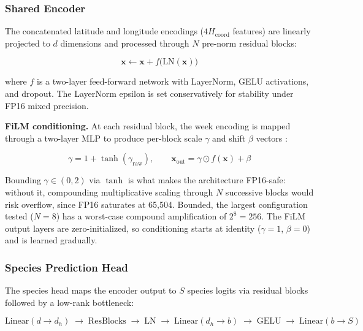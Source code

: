 \subsubsection{Shared Encoder}
\label{sec:encoder}

The concatenated latitude and longitude encodings ($4 H_\text{coord}$ features) are linearly projected to $d$ dimensions and processed through $N$ pre-norm residual blocks:

\begin{equation*}
\mathbf{x} \leftarrow \mathbf{x} + f\bigl(\text{LN}(\mathbf{x})\bigr)
\end{equation*}

where $f$ is a two-layer feed-forward network with LayerNorm, GELU activations, and dropout. The LayerNorm epsilon is set conservatively for stability under FP16 mixed precision.

\textbf{FiLM conditioning.} At each residual block, the week encoding is mapped through a two-layer MLP to produce per-block scale $\gamma$ and shift $\beta$ vectors \citep{perez2018film}:

\begin{equation*}
\gamma = 1 + \tanh(\gamma_\text{raw}), \qquad
\mathbf{x}_\text{out} = \gamma \odot f(\mathbf{x}) + \beta
\end{equation*}

Bounding $\gamma \in (0, 2)$ via $\tanh$ is what makes the architecture FP16-safe: without it, compounding multiplicative scaling through $N$ successive blocks would risk overflow, since FP16 saturates at 65,504. Bounded, the largest configuration tested ($N = 8$) has a worst-case compound amplification of $2^8 = 256$. The FiLM output layers are zero-initialized, so conditioning starts at identity ($\gamma = 1$, $\beta = 0$) and is learned gradually.

\subsubsection{Species Prediction Head}
\label{sec:species-head}

The species head maps the encoder output to $S$ species logits via residual blocks followed by a low-rank bottleneck:

\begin{equation*}
\text{Linear}(d \to d_h) \;\to\; \text{ResBlocks} \;\to\; \text{LN} \;\to\; \text{Linear}(d_h \to b) \;\to\; \text{GELU} \;\to\; \text{Linear}(b \to S)
\end{equation*}

